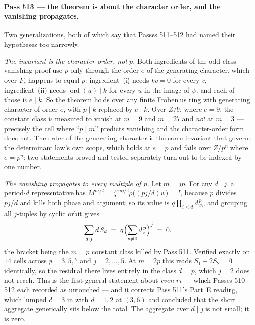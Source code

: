 \documentclass[12pt,a4paper]{article}
\def\mathbb#1{#1}%
\theoremstyle{definition}
\newcommand{\FF}{\mathbb{F}}
\newcommand{\ZZ}{\mathbb{Z}}
\begin{document}
\paragraph{Pass 513 --- the theorem is about the character order, and the
vanishing propagates.}
Two generalizations, both of which say that Passes 511--512 had named their
hypotheses too narrowly.

\emph{The invariant is the character order, not $p$.}  Both ingredients of the
odd-class vanishing proof use $p$ only through the order $e$ of the generating
character, which over $\FF_q$ happens to equal $p$: ingredient~(i) needs $kv=0$
for every $v$, ingredient~(ii) needs $\operatorname{ord}(u)\mid k$ for every $u$
in the image of $\psi$, and each of those is $e\mid k$.  So the theorem holds
over any finite Frobenius ring with generating character of order $e$, with
$p\mid k$ replaced by $e\mid k$.  Over $\ZZ/9$, where $e=9$, the constant class
is measured to vanish at $m=9$ and $m=27$ and \emph{not} at $m=3$ --- precisely
the cell where ``$p\mid m$'' predicts vanishing and the character-order form
does not.  The order of the generating character is the same invariant that
governs the determinant law's own scope, which holds at $e=p$ and fails over
$\ZZ/p^n$ where $e=p^n$; two statements proved and tested separately turn out to
be indexed by one number.

\emph{The vanishing propagates to every multiple of $p$.}  Let $m=jp$.  For any
$d\mid j$, a period-$d$ representative has
$M^{m/d}=\zeta^{s\,pj/d}\rho\bigl((pj/d)w\bigr)=I$, because $p$ divides $pj/d$
and kills both phase and argument; so its value is
$q\prod_{i\le d}d_{w_i}^{\,p}$, and grouping all $j$-tuples by cyclic orbit
gives
\[
\sum_{d\mid j} d\,S_d \;=\; q\Bigl(\sum_{v\neq0}d_v^{\,p}\Bigr)^{j}\;=\;0 ,
\]
the bracket being the $m=p$ constant class killed by Pass 511.  Verified exactly
on $14$ cells across $p=3,5,7$ and $j=2,\dots,5$.  At $m=2p$ this reads
$S_1+2S_2=0$ identically, so the residual there lives entirely in the class
$d=p$, which $j=2$ does not reach.  This is the first general statement about
\emph{even} $m$ --- which Passes 510--512 each recorded as untouched --- and it
corrects Pass 511's Part~E reading, which lumped $d=3$ in with $d=1,2$ at
$(3,6)$ and concluded that the short aggregate generically sits below the total.
The aggregate over $d\mid j$ is not small; it is zero.
\end{document}
